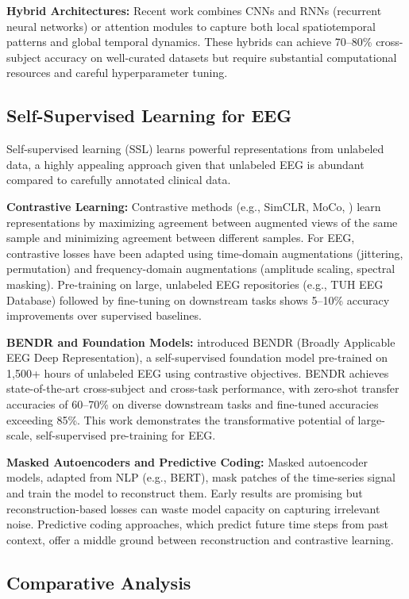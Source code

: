 \documentclass[11pt]{article}
\begin{document}
\textbf{Hybrid Architectures:} Recent work combines CNNs and RNNs (recurrent neural networks) or attention modules to capture both local spatiotemporal patterns and global temporal dynamics. These hybrids can achieve 70--80\% cross-subject accuracy on well-curated datasets but require substantial computational resources and careful hyperparameter tuning.

\subsection{Self-Supervised Learning for EEG}

Self-supervised learning (SSL) learns powerful representations from unlabeled data, a highly appealing approach given that unlabeled EEG is abundant compared to carefully annotated clinical data.

\textbf{Contrastive Learning:} Contrastive methods (e.g., SimCLR, MoCo, \citet{he2020momentum}) learn representations by maximizing agreement between augmented views of the same sample and minimizing agreement between different samples. For EEG, contrastive losses have been adapted using time-domain augmentations (jittering, permutation) and frequency-domain augmentations (amplitude scaling, spectral masking). Pre-training on large, unlabeled EEG repositories (e.g., TUH EEG Database) followed by fine-tuning on downstream tasks shows 5--10\% accuracy improvements over supervised baselines.

\textbf{BENDR and Foundation Models:} \citet{kostas2022bendr} introduced BENDR (Broadly Applicable EEG Deep Representation), a self-supervised foundation model pre-trained on 1,500+ hours of unlabeled EEG using contrastive objectives. BENDR achieves state-of-the-art cross-subject and cross-task performance, with zero-shot transfer accuracies of 60--70\% on diverse downstream tasks and fine-tuned accuracies exceeding 85\%. This work demonstrates the transformative potential of large-scale, self-supervised pre-training for EEG.

\textbf{Masked Autoencoders and Predictive Coding:} Masked autoencoder models, adapted from NLP (e.g., BERT), mask patches of the time-series signal and train the model to reconstruct them. Early results are promising but reconstruction-based losses can waste model capacity on capturing irrelevant noise. Predictive coding approaches, which predict future time steps from past context, offer a middle ground between reconstruction and contrastive learning.

\subsection{Comparative Analysis}
\end{document}
